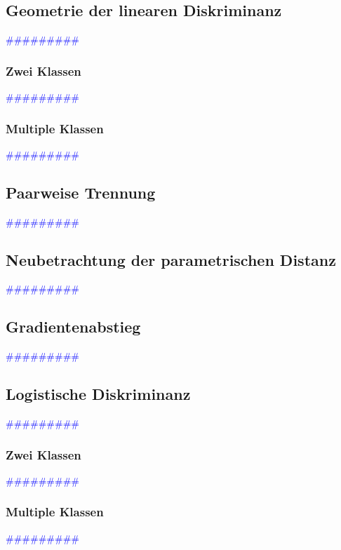 \documentclass{article}
\begin{document}
  \subsection{Geometrie der linearen Diskriminanz} %
      \textcolor{blue}{\#\#\#\#\#\#\#\#\#}
    \subsubsection{Zwei Klassen} %
      \textcolor{blue}{\#\#\#\#\#\#\#\#\#}
    \subsubsection{Multiple Klassen} %
      \textcolor{blue}{\#\#\#\#\#\#\#\#\#}
  \subsection{Paarweise Trennung} %
      \textcolor{blue}{\#\#\#\#\#\#\#\#\#}
  \subsection{Neubetrachtung der parametrischen Distanz} %
      \textcolor{blue}{\#\#\#\#\#\#\#\#\#}
  \subsection{Gradientenabstieg} %
      \textcolor{blue}{\#\#\#\#\#\#\#\#\#}
  \subsection{Logistische Diskriminanz} %
      \textcolor{blue}{\#\#\#\#\#\#\#\#\#}
    \subsubsection{Zwei Klassen} %
      \textcolor{blue}{\#\#\#\#\#\#\#\#\#}
    \subsubsection{Multiple Klassen} %
      \textcolor{blue}{\#\#\#\#\#\#\#\#\#}
\end{document}
